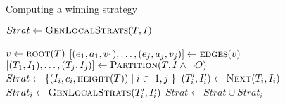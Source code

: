 %
\begin{algorithm}[t]
   \caption{Computing a winning strategy}\label{alg:strat}
   \begin{algorithmic}[1]
            \State $Strat \gets \Call{GenLocalStrats}{T,I}$
            \State {}
        \EndFunction
        \Statex

            \State $v \gets \Call{root}{T}$
            \State $[(e_1, a_1, v_1),\ldots,(e_j,a_j,v_j)] \gets \Call{edges}{v}$
            \State $[(T_1,I_1),\ldots,(T_j, I_j)] \gets \textsc{Partition}(T, I \land \neg O)$
            \State $Strat \gets \{(I_i, c_i, \Call{height}{T}) \mid i \in[1,j]\}$\label{alg:strat:strati}
            \label{alg:strat:for}
                \State $(T_i', I_i') \gets \textsc{Next}(T_i, I_i)$\label{alg:strat:next}
                \State $Strat_i \gets \Call{GenLocalStrats}{T_i', I_i'}$\label{alg:strat:rec}
                \State $Strat \gets Strat \cup Strat_i$
            \EndFor\label{alg:strat:endfor}
            \State {} \label{alg:strat:return}
        \EndFunction
    \end{algorithmic}
\end{algorithm}
%
